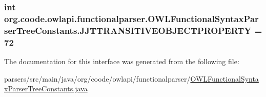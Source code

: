 \hypertarget{interfaceorg_1_1coode_1_1owlapi_1_1functionalparser_1_1_o_w_l_functional_syntax_parser_tree_constants_ae357a4ac74524240d3756861e9b92f04}{
\subsubsection[{J\-J\-T\-T\-R\-A\-N\-S\-I\-T\-I\-V\-E\-O\-B\-J\-E\-C\-T\-P\-R\-O\-P\-E\-R\-T\-Y}]{\setlength{\rightskip}{0pt plus 5cm}int org.\-coode.\-owlapi.\-functionalparser.\-O\-W\-L\-Functional\-Syntax\-Parser\-Tree\-Constants.\-J\-J\-T\-T\-R\-A\-N\-S\-I\-T\-I\-V\-E\-O\-B\-J\-E\-C\-T\-P\-R\-O\-P\-E\-R\-T\-Y = 72}}\label{interfaceorg_1_1coode_1_1owlapi_1_1functionalparser_1_1_o_w_l_functional_syntax_parser_tree_constants_ae357a4ac74524240d3756861e9b92f04}


The documentation for this interface was generated from the following file\-:\begin{DoxyCompactItemize}
\item 
parsers/src/main/java/org/coode/owlapi/functionalparser/\hyperlink{_o_w_l_functional_syntax_parser_tree_constants_8java}{O\-W\-L\-Functional\-Syntax\-Parser\-Tree\-Constants.\-java}\end{DoxyCompactItemize}
